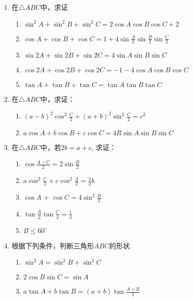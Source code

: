 \begin{enumerate}
    \item 在$\triangle ABC$中，求证
\begin{enumerate}[(1)]
    \item $\sin^{2}A+\sin^{2}B+\sin^{2}C=2\cos A\cos B\cos C+2$
    \item $\cos A+ \cos B+ \cos C= 1+ 4\sin \frac A2\sin \frac B2\sin \frac C2$
    \item $\sin2A+\sin2B+\sin2C=4\sin A\sin B\sin C$
    \item $\cos2A+\cos2B+\cos2C=-1-4\cos A\cos B\cos C$
    \item $\tan A+\tan B+\tan C=\tan A\tan B\tan C$
\end{enumerate}

\item 在$\triangle ABC$中，求证：
\begin{enumerate}[(1)]
    \item     $(a-b)^{2}\cos^{2}\frac{C}{2}+(a+b)^{2}\sin^{2}\frac{C}{2}=c^{2}$
    \item     $a\cos A+b\cos B+c\cos C=4R\sin A\sin B\sin C$
\end{enumerate}    

\item  在$\triangle ABC$中，若$2b=a+c$, 求证：
\begin{multicols}{2}
\begin{enumerate}[(1)]
    \item $\cos \frac {A- C}2= 2\sin \frac B2$
    \item $a\cos^{2}\frac{C}{2}+c\cos^{2}\frac{A}{2}=\frac{3}{2}b$
    \item $\cos A$ + $\cos C= 4\sin ^{2} \frac B2$
    \item $\tan\frac A2\tan\frac C2=\frac13$
    \item $B\le 60^{\circ}$
\end{enumerate}        
\end{multicols}

\item 根据下列条件，判断三角形$ABC$的形状.
\begin{enumerate}[(1)]
    \item $\sin^2 A=\sin^2B+\sin^2C$
    \item $2\cos B\sin C=\sin A$
    \item $a\tan A+b\tan B=(a+b)\tan\frac{A+B}{2}$
\end{enumerate}    
\end{enumerate}

